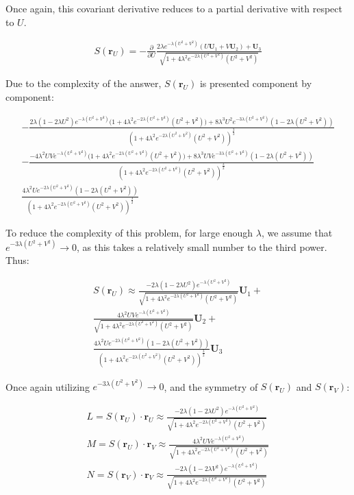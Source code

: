 \documentclass[preprint,12pt]{elsarticle}
\begin{document}
Once again, this covariant derivative reduces to a partial derivative with respect to $U$.

\begin{gather}
	S(\mathbf{r}_U) = -\frac{\partial}{\partial U} \frac{2\lambda e^{-\lambda(U^2 + V^2)}(U\mathbf{U}_1 + V\mathbf{U}_2) + \mathbf{U}_3}{\sqrt{1 + 4\lambda^{2} e^{-2\lambda(U^2 + V^2)}(U^2 + V^2)}}
\end{gather}

Due to the complexity of the answer, $S(\mathbf{r}_U)$ is presented component by component:

\begin{gather}
	-\frac{2\lambda (1 - 2\lambda U^{2}) e^{-\lambda(U^2 + V^2)}\big(1 + 4\lambda^{2}e^{-2\lambda (U^2 + V^2)}(U^2 + V^2)\big) + 8\lambda^{3}U^{2}e^{-3\lambda(U^2 + V^2)}(1-2\lambda(U^2 + V^2))}{(1 + 4\lambda^{2} e^{-2\lambda(U^2 + V^2)}(U^2 + V^2))^{\frac{3}{2}}} \\
	-\frac{-4\lambda^{2} U V e^{-\lambda(U^2 + V^2)}\big(1 + 4\lambda^{2}e^{-2\lambda (U^2 + V^2)}(U^2 + V^2)\big) + 8\lambda^{3}U V e^{-3\lambda(U^2 + V^2)}(1-2\lambda(U^2 + V^2))}{(1 + 4\lambda^{2} e^{-2\lambda(U^2 + V^2)}(U^2 + V^2))^{\frac{3}{2}}}	\\
	\frac{4\lambda^{2}U e^{-2\lambda(U^2 + V^2)}(1 - 2\lambda(U^2 + V^2))}{(1 + 4\lambda^{2} e^{-2\lambda(U^2 + V^2)}(U^2 + V^2))^{\frac{3}{2}}}
\end{gather}

To reduce the complexity of this problem, for large enough $\lambda$, we assume that $e^{-3\lambda(U^2 + V^2)} \to 0$, as this takes a relatively small number to the third power. Thus:

\begin{gather}
	S(\mathbf{r}_U) \approx \frac{-2\lambda (1 - 2\lambda U^{2}) e^{-\lambda(U^2 + V^2)}}{\sqrt{1 + 4\lambda^{2} e^{-2\lambda(U^2 + V^2)}(U^2 + V^2)}}\mathbf{U}_1 + \\
	\frac{4\lambda^{2} U V e^{-\lambda(U^2 + V^2)}}{\sqrt{1 + 4\lambda^{2} e^{-2\lambda(U^2 + V^2)}(U^2 + V^2)}}\mathbf{U}_2 + \\
	\frac{4\lambda^{2}U e^{-2\lambda(U^2 + V^2)}(1 - 2\lambda(U^2 + V^2))}{(1 + 4\lambda^{2} e^{-2\lambda(U^2 + V^2)}(U^2 + V^2))^{\frac{3}{2}}}\mathbf{U}_3
\end{gather}

Once again utilizing $e^{-3\lambda(U^2 + V^2)} \to 0$, and the symmetry of $S(\mathbf{r}_U)$ and $S(\mathbf{r}_V)$:

\begin{gather}
	L = S(\mathbf{r}_U) \cdot \mathbf{r}_U \approx \frac{-2\lambda (1 - 2\lambda U^{2}) e^{-\lambda(U^2 + V^2)}}{\sqrt{1 + 4\lambda^{2} e^{-2\lambda(U^2 + V^2)}(U^2 + V^2)}} \\
	M = S(\mathbf{r}_U) \cdot \mathbf{r}_V \approx \frac{4\lambda^{2} U V e^{-\lambda(U^2 + V^2)}}{\sqrt{1 + 4\lambda^{2} e^{-2\lambda(U^2 + V^2)}(U^2 + V^2)}} \\
	N = S(\mathbf{r}_V) \cdot \mathbf{r}_V \approx \frac{-2\lambda (1 - 2\lambda V^{2}) e^{-\lambda(U^2 + V^2)}}{\sqrt{1 + 4\lambda^{2} e^{-2\lambda(U^2 + V^2)}(U^2 + V^2)}} \\
\end{gather}
\end{document}
